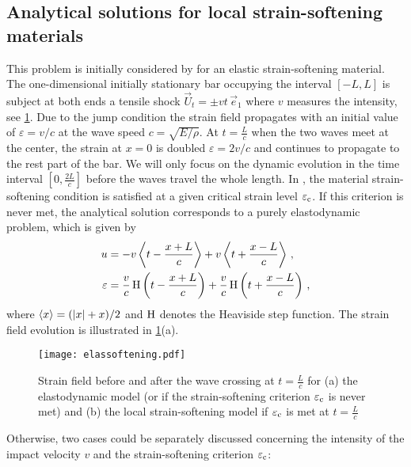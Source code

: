 \subsection{Analytical solutions for local strain-softening materials}
This problem is initially considered by \cite{Bazant:1985aa} for an elastic strain-softening material. The one-dimensional initially stationary bar occupying the interval $[-L,L]$ is subject at both ends a tensile shock $\vec{U}_t=\pm vt\,\vec{e}_1$ where $v$ measures the intensity, see \cref{fig:elassoftening}. Due to the jump condition the strain field propagates with an initial value of $\varepsilon=v/c$ at the wave speed $c=\sqrt{E/\rho}$. At $t=\frac{L}{c}$ when the two waves meet at the center, the strain at $x=0$ is doubled $\varepsilon=2v/c$ and continues to propagate to the rest part of the bar. We will only focus on the dynamic evolution in the time interval $[0,\frac{2L}{c}]$ before the waves travel the whole length. In \cite{Bazant:1985aa}, the material strain-softening condition is satisfied at a given critical strain level $\varepsilon_{\mathrm{c}}$. If this criterion is never met, the analytical solution corresponds to a purely elastodynamic problem, which is given by
\begin{align*}
u &= -v\Braket{t-\frac{x+L}{c}}+v\Braket{t+\frac{x-L}{c}}\,, \\
\varepsilon &= \frac{v}{c}\operatorname{H}\left(t-\frac{x+L}{c}\right)+\frac{v}{c}\operatorname{H}\left(t+\frac{x-L}{c}\right)\,,
\end{align*}
where $\Braket{x}=(\left\lvert{x}\right\rvert+x)/2$ and $\operatorname{H}$ denotes the Heaviside step function. The strain field evolution is illustrated in \cref{fig:elassoftening}(a). 
\begin{figure}[htbp]
\centering
\texttt{[image: elassoftening.pdf]}
\caption{Strain field before and after the wave crossing at $t=\frac{L}{c}$ for (a) the elastodynamic model (or if the strain-softening criterion $\varepsilon_{\mathrm{c}}$ is never met) and (b) the local strain-softening model if $\varepsilon_{\mathrm{c}}$ is met at $t=\frac{L}{c}$} \label{fig:elassoftening}
\end{figure}
Otherwise, two cases could be separately discussed concerning the intensity of the impact velocity $v$ and the strain-softening criterion $\varepsilon_{\mathrm{c}}$:
